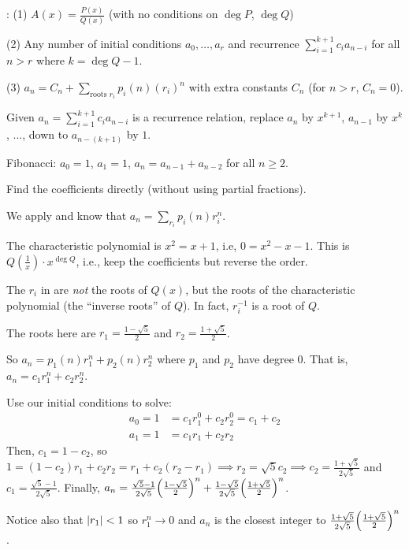 \documentclass[class=math239,notes,tikz]{agony}
\begin{document}
\begin{theorem}[Case 2]\label{thm:main2}
  \TFAE: (1) $A(x) = \frac{P(x)}{Q(x)}$ (with no conditions on $\deg P$, $\deg Q$)

  (2) Any number of initial conditions $a_0,\dotsc,a_r$
  and recurrence $\sum_{i=1}^{k+1}c_i a_{n-i}$ for all $n > r$ where $k = \deg Q -1$.

  (3) $a_n = C_n + \sum_{\text{roots $r_i$}}p_i(n)(r_i)^n$
  with extra constants $C_n$ (for $n > r$, $C_n = 0$).
\end{theorem}

\begin{defn}
  Given $a_n = \sum_{i=1}^{k+1}c_i a_{n-i}$ is a recurrence relation,
  replace $a_n$ by $x^{k+1}$, $a_{n-1}$ by $x^k$, ..., down to $a_{n-(k+1)}$ by $1$.
\end{defn}

\begin{example}
  Fibonacci: $a_0=1$, $a_1=1$, $a_n = a_{n-1} + a_{n-2}$ for all $n \geq 2$.

  Find the coefficients directly (without using partial fractions).
\end{example}
\begin{sol}
  We apply  and know that $a_n = \sum_{r_i} p_i(n) r_i^n$.

  The characteristic polynomial is $x^2 = x + 1$, i.e, $0 = x^2 - x - 1$.
  This is $Q(\frac{1}{x})\cdot x^{\deg Q}$, i.e.,
  keep the coefficients but reverse the order.

  The $r_i$ in  are \emph{not} the roots of $Q(x)$,
  but the roots of the characteristic polynomial (the ``inverse roots'' of $Q$).
  In fact, $r_i^{-1}$ is a root of $Q$.

  The roots here are $r_1 = \frac{1 - \sqrt 5}{2}$ and $r_2 = \frac{1 + \sqrt 5}{2}$.

  So $a_n = p_1(n) r_1^n + p_2(n) r_2^n$ where $p_1$ and $p_2$ have degree 0.
  That is, $a_n = c_1 r_1^n + c_2 r_2^n$.

  Use our initial conditions to solve:
  \begin{align*}
    a_0 = 1 & = c_1 r_1^0 + c_2 r_2^0 = c_1 + c_2 \\
    a_1 = 1 & = c_1 r_1 + c_2 r_2
  \end{align*}
  Then, $c_1 = 1-c_2$, so $1 = (1-c_2)r_1 + c_2 r_2  = r_1 + c_2(r_2-r_1)
    \implies r_2 = \sqrt{5}c_2 \implies c_2 = \frac{1+\sqrt{5}}{2\sqrt{5}}$
  and $c_1 = \frac{\sqrt{5}-1}{2\sqrt{5}}$.
  Finally, $a_n = \frac{\sqrt{5}-1}{2\sqrt{5}}\qty(\frac{1-\sqrt{5}}{2})^n
    + \frac{1-\sqrt{5}}{2\sqrt{5}}\qty(\frac{1+\sqrt{5}}{2})^n$.

  Notice also that $\abs{r_1}<1$ so $r_1^n \to 0$
  and $a_n$ is the closest integer to $\frac{1+\sqrt{5}}{2\sqrt{5}}\qty(\frac{1+\sqrt{5}}{2})^n$.
\end{sol}
\end{document}
